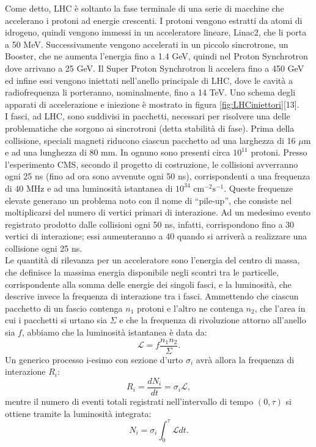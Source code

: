 \noindent Come detto, LHC \`e soltanto la fase terminale di una serie di macchine che accelerano i protoni ad energie crescenti. I protoni vengono estratti da atomi di idrogeno, quindi vengono immessi in un acceleratore lineare, Linac2, che li porta a 50 MeV. Successivamente vengono accelerati in un piccolo sincrotrone, un Booster, che ne aumenta l'energia fino a 1.4 GeV, quindi nel Proton Synchrotron dove arrivano a 25 GeV. Il Super Proton Synchrotron li accelera fino a 450 GeV ed infine essi vengono iniettati nell'anello principale di LHC, dove le cavit\`a a radiofrequenza li porteranno, nominalmente, fino a 14 TeV. Uno schema degli apparati di accelerazione e iniezione \`e mostrato in figura \ref{fig:LHCiniettori}[13].\\%
I fasci, ad LHC, sono suddivisi in pacchetti, necessari per risolvere una delle problematiche che sorgono ai sincrotroni (detta stabilit\`a di fase). Prima della collisione, speciali magneti riducono ciascun pacchetto ad una larghezza di 16 $\mu$m e ad una lunghezza di 80 mm. In ognuno sono presenti circa $10^{11}$ protoni. Presso l'esperimento CMS, secondo il progetto di costruzione, le collisioni avverranno ogni 25 ns (fino ad ora sono avvenute ogni 50 ns), corrispondenti a una frequenza di 40 MHz e ad una luminosit\`a istantanea di $10^{34}\mbox{ cm}^{-2} \mbox{s}^{-1}$. Queste frequenze elevate generano un problema noto con il nome di ``pile-up'', che consiste nel moltiplicarsi del numero di vertici primari di interazione. Ad un medesimo evento registrato prodotto dalle collisioni ogni 50 ns, infatti, corrispondono fino a 30 vertici di interazione; essi aumenteranno a 40 quando si arriver\`a a realizzare una collisione ogni 25 ns.\\
Le quantit\`a di rilevanza per un acceleratore sono l'energia del centro di massa, che definisce la massima energia disponibile negli scontri tra le particelle, corrispondente alla somma delle energie dei singoli fasci, e la luminosit\`a, che descrive invece la frequenza di interazione tra i fasci. Ammettendo che ciascun pacchetto di un fascio contenga $n_1$ protoni e l'altro ne contenga $n_2$, che l'area in cui i pacchetti si urtano sia $\Sigma$ e che la frequenza di rivoluzione attorno all'anello sia $f$, abbiamo che la luminosit\`a istantanea \`e data da:
\begin{equation}
\mathcal{L} = f \frac{n_1 n_2}{\Sigma}.
\end{equation}
Un generico processo i-esimo con sezione d'urto $\sigma_i$ avr\`a allora la frequenza di interazione $R_i$:
\begin{equation}
R_i = \frac{dN_i}{dt}= \sigma_i \mathcal{L},
\end{equation}
mentre il numero di eventi totali registrati nell'intervallo di tempo $(0,\tau)$ si ottiene tramite la luminosit\`a integrata:
\begin{equation}
N_i = \sigma_i \int_0^{\tau} \mathcal{L} dt.
\end{equation}
